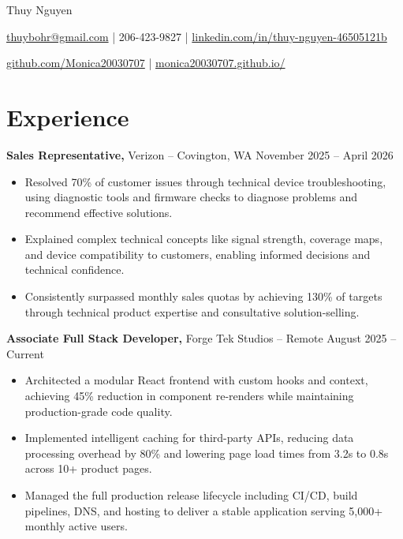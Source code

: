 \documentclass[11pt]{article}       %
\begin{document}
\centerline{\Huge Thuy Nguyen}

\vspace{5pt}

\centerline{\href{mailto:thuybohr@gmail.com}{thuybohr@gmail.com} | 206-423-9827 |
\href{https://www.linkedin.com/in/thuy-nguyen-46505121b/}{linkedin.com/in/thuy-nguyen-46505121b}}

\centerline{\href{https://github.com/Monica20030707}{github.com/Monica20030707} | 
\href{https://monica20030707.github.io/}{monica20030707.github.io/}} 

\vspace{-9pt}

\section*{Experience}

\textbf{Sales Representative,} {Verizon} -- Covington, WA \hfill November 2025 -- April 2026 \\
\vspace{-9pt}
\begin{itemize}
  \item Resolved 70\% of customer issues through technical device troubleshooting, using diagnostic tools and firmware checks to diagnose problems and recommend effective solutions.
  \item Explained complex technical concepts like signal strength, coverage maps, and device compatibility to customers, enabling informed decisions and technical confidence.
  \item Consistently surpassed monthly sales quotas by achieving 130\% of targets through technical product expertise and consultative solution-selling.
\end{itemize}

\textbf{Associate Full Stack Developer,} {Forge Tek Studios} -- Remote \hfill August 2025 -- Current 
\vspace{-9pt}
\begin{itemize}
  \item Architected a modular React frontend with custom hooks and context, achieving 45\% reduction in component re-renders while maintaining production-grade code quality.
  \item Implemented intelligent caching for third-party APIs, reducing data processing overhead by 80\% and lowering page load times from 3.2s to 0.8s across 10+ product pages.
  \item Managed the full production release lifecycle including CI/CD, build pipelines, DNS, and hosting to deliver a stable application serving 5,000+ monthly active users.
\end{itemize}
\end{document}

